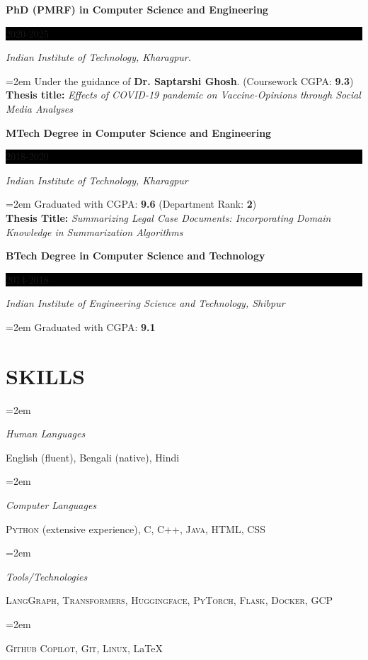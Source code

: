 \documentclass[paper=a4,fontsize=10pt]{scrartcl} %
\newlength{\spacebox}
\newcommand{\sepspace}{\vspace*{0.6em}}		%
\newcommand{\NewPart}[1]{\section*{\uppercase{#1}}}
\newcommand{\PersonalEntry}[2]{
		\noindent\hangindent=2em\hangafter=0 %
		\parbox{\spacebox}{        %
		\textit{#1}}		       %
		\hspace{1.5em} #2 \par}    %
\newcommand{\SkillsEntry}[2]{      %
		\noindent\hangindent=2em\hangafter=0 %
		\parbox{\spacebox}{        %
		\textit{#1}}			   %
		\hspace{1.5em} #2 \par}    %
\newcommand{\EducationEntry}[4]{
		\noindent \textbf{#1} \hfill      %
		\colorbox{Black}{%
			\parbox{6em}{%
			\hfill\color{White}#2}} \par  %
		\noindent \textit{#3} \par        %
		\noindent\hangindent=2em\hangafter=0 \small #4 %
		\normalsize \par}
\begin{document}
\vspace*{-1mm}

\EducationEntry{PhD (PMRF) in Computer Science and Engineering}{2020-2025}{Indian Institute of Technology, Kharagpur. }{Under the guidance of \textbf{Dr. Saptarshi Ghosh}. (Coursework CGPA: \textbf{9.3})\\ 
\textbf{Thesis title:} \textit{Effects of COVID-19 pandemic on
Vaccine-Opinions through Social Media Analyses}}
\sepspace

\EducationEntry{MTech Degree in Computer Science and Engineering}{2018-2020}{Indian Institute of Technology, Kharagpur}{Graduated with CGPA: \textbf{9.6} (Department Rank: \textbf{2}) \\ \textbf{Thesis Title:} \textit{Summarizing Legal Case Documents: Incorporating Domain Knowledge in Summarization Algorithms}}
\sepspace

\EducationEntry{BTech Degree in Computer Science and Technology}{2014-2018}{Indian Institute of Engineering Science and Technology, Shibpur}{Graduated with CGPA: \textbf{9.1} }



\vspace*{-1mm}





\NewPart{Skills}{}

\vspace*{-1mm}

\SkillsEntry{Human Languages}{English (fluent), Bengali (native), Hindi}

\SkillsEntry{Computer Languages}{\textsc{Python} (extensive experience), \textsc{C}, \textsc{C++}, \textsc{Java}, \textsc{HTML}, \textsc{CSS}}

\SkillsEntry{Tools/Technologies}{\textsc{LangGraph}, \textsc{Transformers}, \textsc{Huggingface}, \textsc{PyTorch}, \textsc{Flask}, \textsc{Docker}, \textsc{GCP}}


\SkillsEntry{}{\textsc{Github Copilot}, \textsc{Git}, \textsc{Linux}, \LaTeX
}
\end{document}
